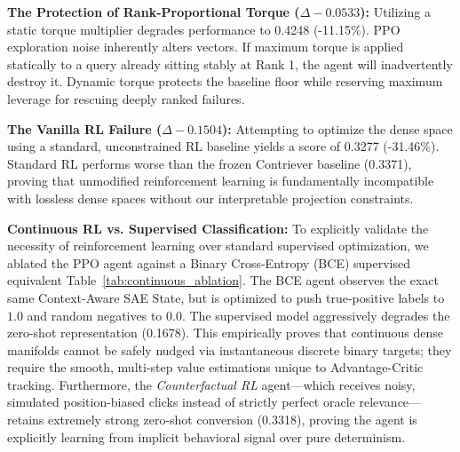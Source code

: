 \textbf{The Protection of Rank-Proportional Torque ($\Delta -0.0533$):} Utilizing a static torque multiplier degrades performance to 0.4248 (-11.15\%). PPO exploration noise inherently alters vectors. If maximum torque is applied statically to a query already sitting stably at Rank 1, the agent will inadvertently destroy it. Dynamic torque protects the baseline floor while reserving maximum leverage for rescuing deeply ranked failures.

\textbf{The Vanilla RL Failure ($\Delta -0.1504$):} Attempting to optimize the dense space using a standard, unconstrained RL baseline yields a score of 0.3277 (-31.46\%). Standard RL performs worse than the frozen Contriever baseline (0.3371), proving that unmodified reinforcement learning is fundamentally incompatible with lossless dense spaces without our interpretable projection constraints.

\begin{table}[htbp]
  \caption{Continuous Optimization Ablations. Performance (NDCG@10) on the ArguAna corpus comparing continuous RL formulation against standard discrete supervision and noisy implicit feedback.}
  \begin{center}
  \end{center}
  \label{tab:continuous_ablation}
\end{table}

\textbf{Continuous RL vs. Supervised Classification:} To explicitly validate the necessity of reinforcement learning over standard supervised optimization, we ablated the PPO agent against a Binary Cross-Entropy (BCE) supervised equivalent Table~\ref{tab:continuous_ablation}. The BCE agent observes the exact same Context-Aware SAE State, but is optimized to push true-positive labels to $1.0$ and random negatives to $0.0$. The supervised model aggressively degrades the zero-shot representation (0.1678). This empirically proves that continuous dense manifolds cannot be safely nudged via instantaneous discrete binary targets; they require the smooth, multi-step value estimations unique to Advantage-Critic tracking. Furthermore, the \textit{Counterfactual RL} agent—which receives noisy, simulated position-biased clicks instead of strictly perfect oracle relevance—retains extremely strong zero-shot conversion (0.3318), proving the agent is explicitly learning from implicit behavioral signal over pure determinism.

